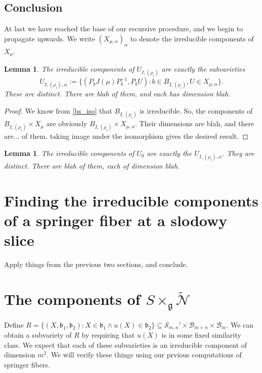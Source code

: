 \documentclass[12pt,psamsfonts]{article}
\newtheorem{lemma}[theorem]{Lemma}
\begin{document}
\subsection{Conclusion}
At last we have reached the base of our recursive procedure, and we begin to propagate upwards.
We write \((X_{\mu, \alpha})_\alpha\) to denote the irreducible components of \(X_\mu\).
\begin{lemma}
    The irreducible components of \(U_{I, (\rho_i)}\) are exactly the subvarieties 
    \[U_{I, (\rho_i), \alpha} := \{(P_b J(\mu) P_b^{-1}, P_b U) : b \in B_{I, (\rho_i)}, U \in X_{\mu, \alpha}\}.\]
    These are distinct.  
    There are blah of them, and each has dimension blah.
\end{lemma}
\begin{proof}
    We know from \cref{bs_iso} that \(B_{I, (\rho_i)}\) is irreducible.
    So, the components of \(B_{I, (\rho_i)} \times X_\mu\) are obviously \(B_{I, (\rho_i)} \times X_{\mu, \alpha}\).
    Their dimensions are blah, and there are... of them.
    taking image under the isomorphism gives the desired result.
\end{proof}

\begin{lemma}
    The irreducible components of \(U_0\) are exactly the \(U_{I, (\rho_i), \alpha}\).
    They are distinct.
    There are blah of them, each of dimension blah.
\end{lemma}

\section{Finding the irreducible components of a springer fiber at a slodowy slice}
Apply things from the previous two sections, and conclude.

\section{The components of \(S \times_\mathfrak{g} \widetilde{\mathcal{N}}\)}
Define \(R = \{(X, \mathfrak{b}_1, \mathfrak{b}_2) : X \in \mathfrak{b}_1 \land u(X) \in \mathfrak{b}_2\} \subseteq \mathcal{S}_{m,n}' \times \mathcal{B}_{m + n} \times \mathcal{B}_m\).
We can obtain a subvariety of \(R\) by requiring that \(u(X)\) is in some fixed similarity class.
We expect that each of these subvarieties is an irreducible component of dimension \(m^2\).
We will verify these things using our prvious computations of springer fibers.
\end{document}
